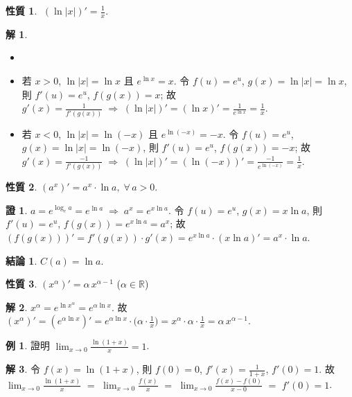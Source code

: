 \documentclass[12pt]{extarticle}
\newcommand{\ds}{\displaystyle}
\newcommand{\ie}{\;\Longrightarrow\;}
\theoremstyle{definition}
\newtheorem*{prp}{性質}
\newtheorem*{fact}{結論}
\newtheorem*{ex}{例}
\newtheorem*{sol}{解}
\newtheorem*{prf}{證}
\begin{document}
\begin{prp}
  $\ds\;(\ln |x|)' = \frac{1}{x}$. 
\end{prp}

\begin{sol}
  \begin{itemize}
    \item[]
    \item 若 $x > 0$, $\ln |x| = \ln x$ 且 $\ds e^{\ln x} = x$. 令 $f(u) = e^u$, $g(x) = \ln|x| = \ln x$, 則 $\ds f'(u) = e^u$, $\ds f(g(x)) = x$; 故 $\ds g'(x) = \frac{1}{f'(g(x))}\ie (\ln|x|)' = (\ln x)' = \frac{1}{e^{\ln x}} = \frac{1}{x}$. 
    \item 若 $x < 0$, $\ln |x| = \ln(-x)$ 且 $\ds e^{\ln(-x)} = -x$. 令 $f(u) = e^u$, $g(x) = \ln|x| = \ln(-x)$, 則 $\ds f'(u) = e^u$, $\ds f(g(x)) = -x$; 故 $\ds g'(x) = \frac{-1}{f'(g(x))}\ie (\ln|x|)' = (\ln(-x))' = \frac{-1}{e^{\ln(-x)}} = \frac{1}{x}$. 
  \end{itemize}
\end{sol}

\begin{prp}
  $\ds(a^x)' = a^x\cdot\ln a,\;\forall\,a > 0$. 
\end{prp}

\begin{prf}
  $\ds a = e^{\log_e a} = e^{\ln a} \ie a^x = e^{x\ln a}$. 令 $f(u) = e^u$, $g(x) = x\ln a$, 則 $\ds f'(u) = e^u$, $\ds f(g(x)) = e^{x\ln a} = a^x$; 故 $(f(g(x)))' = f'(g(x))\cdot g'(x) = e^{x\ln a}\cdot(x\ln a)' = a^x\cdot\ln a$. 
\end{prf}

\begin{fact}
  $\ds C(a) = \ln a$. 
\end{fact}

\begin{prp}
  $\ds (x^\alpha)' = \alpha\,x^{\alpha - 1}$ ($\alpha\in\mathbb{R}$) 
\end{prp}

\begin{sol}
  $\ds x^\alpha = e^{\ln x^\alpha} = e^{\alpha\ln x}$. 故 $\ds(x^\alpha)' = (e^{\alpha\ln x})' = e^{\alpha\ln x}\cdot\Big(\alpha\cdot\frac{1}{x}\Big) = x^\alpha\cdot\alpha\cdot\frac{1}{x} = \alpha\,x^{\alpha - 1}$. 
\end{sol}

\begin{ex}
  證明 $\ds\lim_{x\to 0}\frac{\ln(1 + x)}{x} = 1$.
\end{ex}

\begin{sol}
  令 $f(x) = \ln(1 + x)$, 則 $f(0) = 0$, $\ds f'(x) = \frac{1}{1 + x}$, $f'(0) = 1$. 故 $\ds\lim_{x\to 0}\frac{\ln(1 + x)}{x}$ $=$ $\ds\lim_{x\to 0}\frac{f(x)}{x}$ $=$ $\ds\lim_{x\to 0}\frac{f(x) - f(0)}{x - 0}$ $=$ $f'(0) = 1$.
\end{sol}
\end{document}
